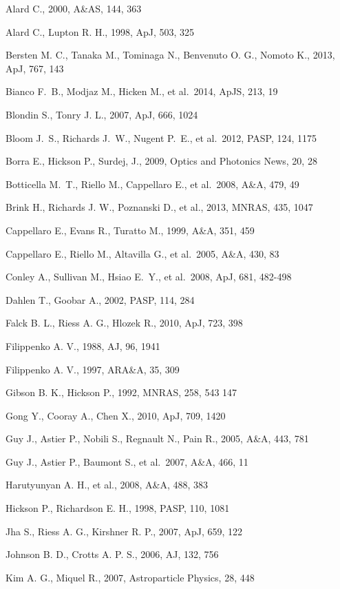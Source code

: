 \documentclass[12pt,a4paper]{article}
\begin{document}
\footnotesize
\beginrefer

 Alard C., 2000, A\&AS, 144, 363

 Alard C., Lupton R. H., 1998, ApJ, 503, 325

 Bersten M. C., Tanaka M., Tominaga N., Benvenuto O. G., Nomoto K., 2013, ApJ, 767, 143

 Bianco F.~B., Modjaz M., Hicken M., et al.\ 2014, ApJS, 213, 19

 Blondin S., Tonry J. L., 2007, ApJ, 666, 1024

 Bloom J.~S., Richards J.~W., Nugent P.~E., et al.\ 2012, PASP, 124, 1175

 Borra E., Hickson P., Surdej, J., 2009, Optics and Photonics News, 20, 28

 Botticella M.~T., Riello M., Cappellaro E., et al.\ 2008, A\&A, 479, 49

 Brink H., Richards J. W., Poznanski D., et al., 2013, MNRAS, 435, 1047

 Cappellaro E., Evans R., Turatto M., 1999, A\&A, 351, 459

 Cappellaro E., Riello M., Altavilla G., et al.\ 2005, A\&A, 430, 83 

 Conley A., Sullivan M., Hsiao E.~Y., et al.\ 2008, ApJ, 681, 482-498 

 Dahlen T., Goobar A., 2002, PASP, 114, 284

 Falck B. L., Riess A. G., Hlozek R., 2010, ApJ, 723, 398

 Filippenko A. V., 1988, AJ, 96, 1941

 Filippenko A. V., 1997, ARA\&A, 35, 309

 Gibson B. K., Hickson P., 1992, MNRAS, 258, 543 147

 Gong Y., Cooray A., Chen X., 2010, ApJ, 709, 1420

 Guy J., Astier P., Nobili S., Regnault N., Pain R., 2005, A\&A, 443, 781

 Guy J., Astier P., Baumont S., et al.\ 2007, A\&A, 466, 11 

 Harutyunyan A. H., et al., 2008, A\&A, 488, 383

 Hickson P., Richardson E. H., 1998, PASP, 110, 1081

 Jha S., Riess A. G., Kirshner R. P., 2007, ApJ, 659, 122

 Johnson B. D., Crotts A. P. S., 2006, AJ, 132, 756

 Kim A. G., Miquel R., 2007, Astroparticle Physics, 28, 448
\end{document}
